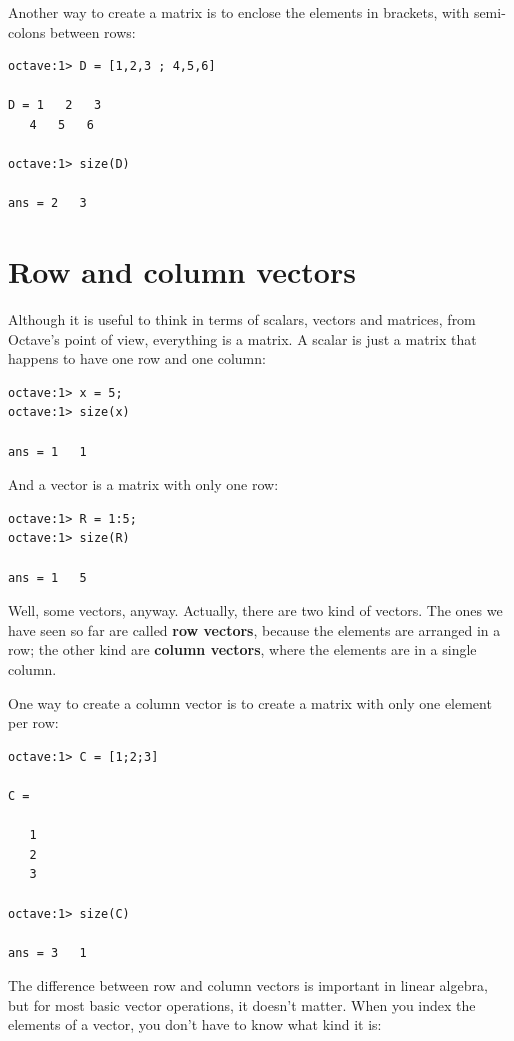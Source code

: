 Another way to create a matrix is to enclose the elements in
brackets, with semi-colons between rows:

\begin{verbatim}
octave:1> D = [1,2,3 ; 4,5,6]

D = 1   2   3
   4   5   6

octave:1> size(D)

ans = 2   3
\end{verbatim}


\section{Row and column vectors}

Although it is useful to think in terms of scalars, vectors and matrices,
from Octave's point of view, everything is a matrix. A scalar
is just a matrix that happens to have one row and one column:

\begin{verbatim}
octave:1> x = 5;
octave:1> size(x)

ans = 1   1
\end{verbatim}

And a vector is a matrix with only one row:

\begin{verbatim}
octave:1> R = 1:5;
octave:1> size(R)

ans = 1   5
\end{verbatim}

Well, some vectors, anyway. Actually, there are two kind
of vectors. The ones we have seen so far are called {\bf row vectors},
because the elements are arranged in a row; the other kind are
{\bf column vectors}, where the elements are in a single column.

One way to create a column vector is to create a matrix with only
one element per row:

\begin{verbatim}
octave:1> C = [1;2;3]

C =

   1
   2
   3

octave:1> size(C)

ans = 3   1
\end{verbatim}

The difference between row and column vectors is important in
linear algebra, but for
most basic vector operations, it doesn't matter. When you
index the elements of a vector, you don't have to know what kind
it is:

